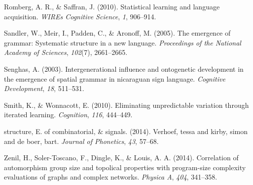 \documentclass[10pt, letterpaper]{article}
\begin{document}
\hypertarget{ref-romberg-2010}{}
Romberg, A. R., \& Saffran, J. (2010). Statistical learning and language
acquisition. \emph{WIREs Cognitive Science}, \emph{1}, 906--914.

\hypertarget{ref-sandler-2005}{}
Sandler, W., Meir, I., Padden, C., \& Aronoff, M. (2005). The emergence
of grammar: Systematic structure in a new language. \emph{Proceedings of
the National Academy of Sciences}, \emph{102}(7), 2661--2665.

\hypertarget{ref-senghas-2003}{}
Senghas, A. (2003). Intergenerational influence and ontogenetic
development in the emergence of spatial grammar in nicaraguan sign
language. \emph{Cognitive Development}, \emph{18}, 511--531.

\hypertarget{ref-smith-2010}{}
Smith, K., \& Wonnacott, E. (2010). Eliminating unpredictable variation
through iterated learning. \emph{Cognition}, \emph{116}, 444--449.

\hypertarget{ref-verhoef-2014}{}
structure, E. of combinatorial, \& signals. (2014). Verhoef, tessa and
kirby, simon and de boer, bart. \emph{Journal of Phonetics}, \emph{43},
57--68.

\hypertarget{ref-zenil-2014}{}
Zenil, H., Soler-Toscano, F., Dingle, K., \& Louis, A. A. (2014).
Correlation of automorphism group size and topolical properties with
program-size complexity evaluations of graphs and complex networks.
\emph{Physica A}, \emph{404}, 341--358.


\end{document}
